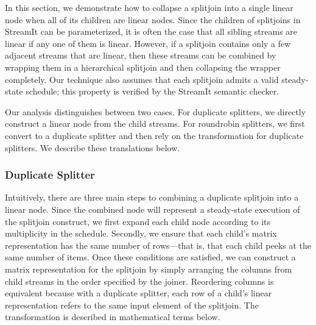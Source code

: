 \documentclass{sig-alternate}
\begin{document}
{In this section, we demonstrate how to collapse a splitjoin into
a single linear node when all of its children are linear nodes.  Since
the children of splitjoins in StreamIt can be parameterized, it
is often the case that all sibling streams are linear if any one of
them is linear.  However, if a splitjoin contains only a few
adjacent streams that are linear, then these streams can be combined
by wrapping them in a hierarchical splitjoin and then collapsing the
wrapper completely.  Our technique also assumes that each 
splitjoin admits a valid steady-state schedule; this property is
verified by the StreamIt semantic checker.

Our analysis distinguishes between two cases. For duplicate splitters,
we directly construct a linear node from the child streams.  For
roundrobin splitters, we first convert to a duplicate
splitter and then rely on the transformation for duplicate splitters.
We describe these translations below.

\subsubsection{Duplicate Splitter}

Intuitively, there are three main steps to combining a duplicate
splitjoin into a linear node.  Since the combined node will represent
a steady-state execution of the splitjoin construct, we first 
expand each child node according to its multiplicity in the schedule.
Secondly, we ensure that each child's matrix representation
has the same number of rows---that is, that each child peeks at the
same number of items.  Once these conditions are satisfied, we can
construct a matrix representation for the splitjoin by simply
arranging the columns from child streams in the order specified by the
joiner. Reordering columns is equivalent because with a duplicate
splitter, each row of a child's linear representation refers to the
same input element of the splitjoin. The transformation 
is described in mathematical terms below.


}
\end{document}
